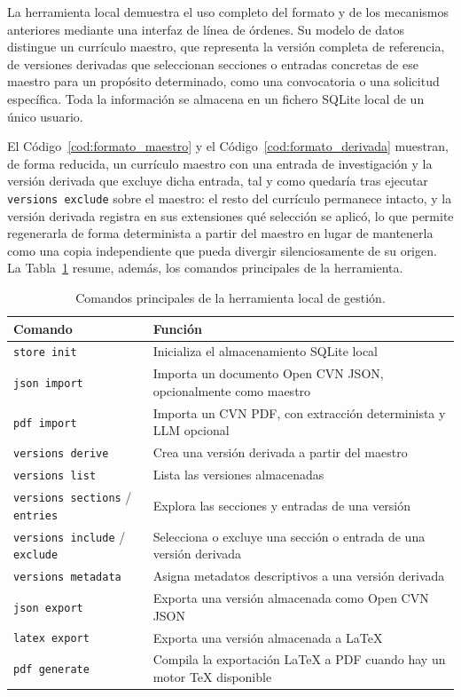 La herramienta local demuestra el uso completo del formato y de los
mecanismos anteriores mediante una interfaz de línea de órdenes. Su modelo de
datos distingue un currículo maestro, que representa la versión completa de
referencia, de versiones derivadas que seleccionan secciones o entradas
concretas de ese maestro para un propósito determinado, como una
convocatoria o una solicitud específica. Toda la información se almacena en
un fichero SQLite local de un único usuario.

El Código~\ref{cod:formato_maestro} y el Código~\ref{cod:formato_derivada}
muestran, de forma reducida, un currículo maestro con una entrada de
investigación y la versión derivada que excluye dicha entrada, tal y como
quedaría tras ejecutar \texttt{versions exclude} sobre el maestro: el resto
del currículo permanece intacto, y la versión derivada registra en sus
extensiones qué selección se aplicó, lo que permite regenerarla de forma
determinista a partir del maestro en lugar de mantenerla como una copia
independiente que pueda divergir silenciosamente de su origen. La
Tabla~\ref{tab:formato_comandos} resume, además, los comandos principales de
la herramienta.

\begin{table}[htbp]
  \centering
  \small
  \renewcommand{\arraystretch}{1.1}
  \begin{tabular}{p{} p{}}
    \hline
    \textbf{Comando} & \textbf{Función} \\
    \hline
    \texttt{store init} & Inicializa el almacenamiento SQLite local \\
    \texttt{json import} & Importa un documento Open CVN JSON, opcionalmente como maestro \\
    \texttt{pdf import} & Importa un CVN PDF, con extracción determinista y LLM opcional \\
    \texttt{versions derive} & Crea una versión derivada a partir del maestro \\
    \texttt{versions list} & Lista las versiones almacenadas \\
    \texttt{versions sections} / \texttt{entries} & Explora las secciones y entradas de una versión \\
    \texttt{versions include} / \texttt{exclude} & Selecciona o excluye una sección o entrada de una versión derivada \\
    \texttt{versions metadata} & Asigna metadatos descriptivos a una versión derivada \\
    \texttt{json export} & Exporta una versión almacenada como Open CVN JSON \\
    \texttt{latex export} & Exporta una versión almacenada a LaTeX \\
    \texttt{pdf generate} & Compila la exportación LaTeX a PDF cuando hay un motor TeX disponible \\
    \hline
  \end{tabular}
  \caption{Comandos principales de la herramienta local de gestión.}
  \label{tab:formato_comandos}
\end{table}


